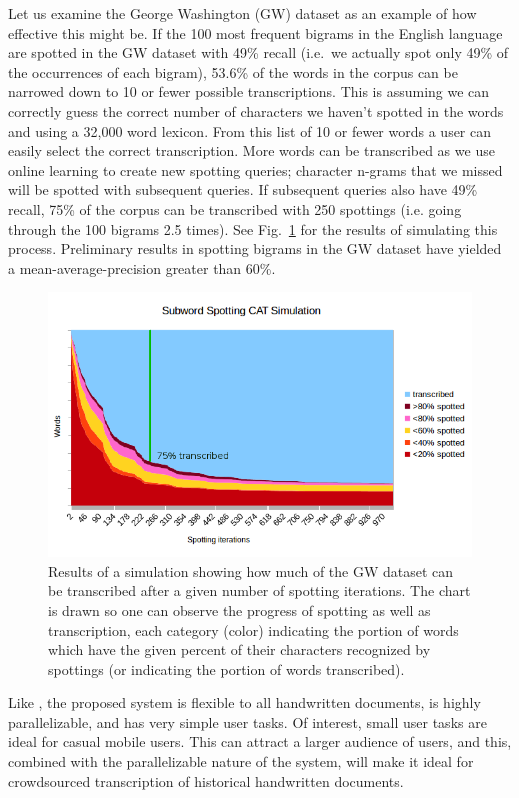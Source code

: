 \documentclass[conference]{IEEEtran}
\begin{document}
Let us examine the George Washington (GW) dataset\cite{GW} as an example of how effective this might be. If the 100 most frequent bigrams in the English language are spotted in the GW dataset with 49\% recall (i.e.~we actually spot only 49\% of the occurrences of each bigram), 53.6\% of the words in the corpus can be narrowed down to 10 or fewer possible transcriptions. This is assuming we can correctly guess the correct number of characters we haven't spotted in the words and using a 32,000 word lexicon. From this list of 10 or fewer words a user can easily select the correct transcription. More words can be transcribed as we use online learning to create new spotting queries; character n-grams that we missed will be spotted with subsequent queries. If subsequent queries also have 49\% recall, 75\% of the corpus can be transcribed with 250 spottings (i.e. going through the 100 bigrams 2.5 times). See Fig.~\ref{fig:fullSim} for the results of simulating this process. Preliminary results in spotting bigrams in the GW dataset have yielded a mean-average-precision greater than 60\%.

\begin{figure}
    \centering
    \includegraphics[width=.49\textwidth]{simulationGraph_line}
    \caption{Results of a simulation showing how much of the GW dataset can be transcribed after a given number of spotting iterations. The chart is drawn so one can observe the progress of spotting as well as transcription, each category (color) indicating the portion of words which have the given percent of their characters recognized by spottings (or indicating the portion of words transcribed).}
    \label{fig:fullSim}
\end{figure}

Like \cite{Neudecker2010}, the proposed system is flexible to all handwritten documents, is highly parallelizable, and has very simple user tasks. Of interest, small user tasks are ideal for casual mobile users. This can attract a larger audience of users, and this, combined with the parallelizable nature of the system, will make it ideal for crowdsourced transcription of historical handwritten documents.
\end{document}
